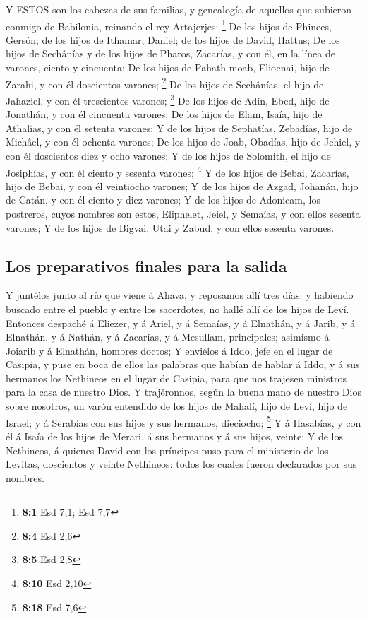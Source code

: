  Y ESTOS son los cabezas de sus familias, y genealogía de
aquellos que subieron conmigo de Babilonia, reinando el rey Artajerjes:
\footnote{\textbf{8:1} Esd 7,1; Esd 7,7}  De los hijos de
Phinees, Gersón; de los hijos de Ithamar, Daniel; de los hijos de David,
Hattus;  De los hijos de Sechânías y de los hijos de Pharos,
Zacarías, y con él, en la línea de varones, ciento y cincuenta;
 De los hijos de Pahath-moab, Elioenai, hijo de Zarahi, y
con él doscientos varones; \footnote{\textbf{8:4} Esd 2,6} 
De los hijos de Sechânías, el hijo de Jahaziel, y con él trescientos
varones; \footnote{\textbf{8:5} Esd 2,8}  De los hijos de
Adín, Ebed, hijo de Jonathán, y con él cincuenta varones; 
De los hijos de Elam, Isaía, hijo de Athalías, y con él setenta varones;
 Y de los hijos de Sephatías, Zebadías, hijo de Michâel, y
con él ochenta varones;  De los hijos de Joab, Obadías, hijo
de Jehiel, y con él doscientos diez y ocho varones;  Y de
los hijos de Solomith, el hijo de Josiphías, y con él ciento y sesenta
varones; \footnote{\textbf{8:10} Esd 2,10}  Y de los hijos
de Bebai, Zacarías, hijo de Bebai, y con él veintiocho varones;
 Y de los hijos de Azgad, Johanán, hijo de Catán, y con él
ciento y diez varones;  Y de los hijos de Adonicam, los
postreros, cuyos nombres son estos, Eliphelet, Jeiel, y Semaías, y con
ellos sesenta varones;  Y de los hijos de Bigvai, Utai y
Zabud, y con ellos sesenta varones.

\hypertarget{los-preparativos-finales-para-la-salida}{%
\subsection{Los preparativos finales para la
salida}\label{los-preparativos-finales-para-la-salida}}

 Y juntélos junto al río que viene á Ahava, y reposamos
allí tres días: y habiendo buscado entre el pueblo y entre los
sacerdotes, no hallé allí de los hijos de Leví.  Entonces
despaché á Eliezer, y á Ariel, y á Semaías, y á Elnathán, y á Jarib, y á
Elnathán, y á Nathán, y á Zacarías, y á Mesullam, principales; asimismo
á Joiarib y á Elnathán, hombres doctos;  Y enviélos á Iddo,
jefe en el lugar de Casipia, y puse en boca de ellos las palabras que
habían de hablar á Iddo, y á sus hermanos los Nethineos en el lugar de
Casipia, para que nos trajesen ministros para la casa de nuestro Dios.
 Y trajéronnos, según la buena mano de nuestro Dios sobre
nosotros, un varón entendido de los hijos de Mahalí, hijo de Leví, hijo
de Israel; y á Serabías con sus hijos y sus hermanos, dieciocho;
\footnote{\textbf{8:18} Esd 7,6}  Y á Hasabías, y con él á
Isaía de los hijos de Merari, á sus hermanos y á sus hijos, veinte;
 Y de los Nethineos, á quienes David con los príncipes puso
para el ministerio de los Levitas, doscientos y veinte Nethineos: todos
los cuales fueron declarados por sus nombres.

